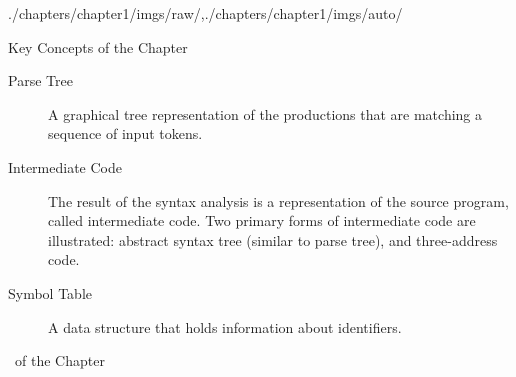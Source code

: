\begin{graphicspathcontext}{{./chapters/chapter1/imgs/raw/},{./chapters/chapter1/imgs/auto/}}
\begin{bibunit}[apalike]
\begin{frame}[t]{Key Concepts of the Chapter}
\begin{description}
	\item[Parse Tree] A graphical tree representation of the productions that are matching a sequence of input tokens.
	\item[Intermediate Code] The result of the syntax analysis is a representation of the source program, called intermediate code. Two primary forms of intermediate code are illustrated: abstract syntax tree (similar to parse tree), and three-address code.
	\item[Symbol Table] A data structure that holds information about identifiers.
	\end{description}
\end{frame}

\begin{frame}[t]{\bibname\ of the Chapter}%
	\tiny%
\end{frame}%

\end{bibunit}
\end{graphicspathcontext}